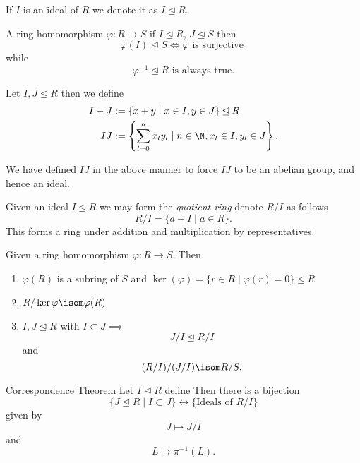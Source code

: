 \documentclass[master.tex]{subfiles}
\begin{document}
\begin{notation}
  If \(I\) is an ideal of \(R\) we denote it as \(I \unlhd R\).
\end{notation}

\begin{prop}
  A ring homomorphism \(\varphi \colon R \to S\) if \(I \unlhd R\), \(J \unlhd S\) then
  \[\varphi(I) \unlhd S \iff \varphi \text{ is surjective }\]
  while
  \[\varphi^{-1} \unlhd R \text{ is always true.}\]
\end{prop}

\begin{defn*}
  Let \(I,J \unlhd R\) then we define
  \begin{align*}
    I+J &:= \{x+y \mid x \in I, y \in J\} \unlhd R\\
    IJ  &:= \left\{\sum_{l=0}^nx_l y_l \mid n \in \N, x_l \in I, y_l \in J\right\}.
  \end{align*}
\end{defn*}
We have defined \(IJ\) in the above manner to force \(IJ\) to be an abelian group, and hence an ideal.

\begin{defn*}
  Given an ideal \(I \unlhd R\) we may form the \emph{quotient ring} denote \(R/I\) as follows
  \[R/I = \{a+I\mid a \in R\}.\] This forms a ring under addition and multiplication by representatives.
\end{defn*}

\begin{thm} Given a ring homomorphism \(\varphi \colon R \to S\). Then
  \begin{enumerate}[label=(\alph*)]
  \item \(\varphi(R)\) is a subring of \(S\) and \(\ker(\varphi)=\{r \in R \mid \varphi(r)=0\} \unlhd R\)
  \item \(R/\ker \varphi \isom \varphi(R)\)
  \item \(I,J \unlhd R\) with \(I \subset J \implies\)
    \[J/I\unlhd R/I\] and
    \[(R/I)/(J/I) \isom R/S.\]
  \end{enumerate}
\end{thm}

\begin{prop}{Correspondence Theorem}
  Let \(I \unlhd R\) define  Then there is a bijection
  \[\{J \unlhd R \mid I \subset J\} \longleftrightarrow \{\text{Ideals of } R/I \}\] given by
  \[J \longmapsto J/I\] and
  \[L \longmapsto \pi^{-1}(L).\]
\end{prop}
\end{document}
